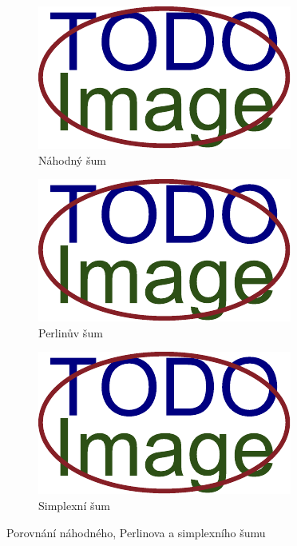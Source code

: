\begin{figure}[H]
	\centering
	\begin{subfigure}{0.32\textwidth}
		\includegraphics[width=\textwidth]{obrazky-figures/placeholder.pdf}
		\caption{Náhodný šum}
		\label{fig:perlin:porovnání:náhodný}
	\end{subfigure}
	\hfill
	\begin{subfigure}{0.32\textwidth}
		\includegraphics[width=\textwidth]{obrazky-figures/placeholder.pdf}
		\caption{Perlinův šum}
		\label{fig:perlin:porovnání:perlin}
	\end{subfigure}
	\hfill
	\begin{subfigure}{0.32\textwidth}
		\includegraphics[width=\textwidth]{obrazky-figures/placeholder.pdf}
		\caption{Simplexní šum}
		\label{fig:perlin:porovnání:simplex}
	\end{subfigure}
	\caption{Porovnání náhodného, Perlinova a simplexního šumu}
	\label{fig:perlin:porovnání}
\end{figure}


